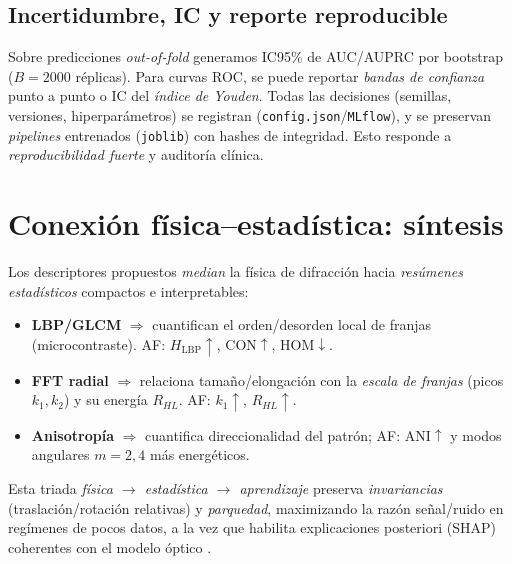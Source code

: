 \subsection{Incertidumbre, IC y reporte reproducible}
\label{subsec:uncertainty}

Sobre predicciones \emph{out-of-fold} generamos IC95\% de AUC/AUPRC por bootstrap ($B{=}2000$ réplicas). Para curvas ROC, se puede reportar \emph{bandas de confianza} punto a punto o IC del \emph{índice de Youden}. Todas las decisiones (semillas, versiones, hiperparámetros) se registran (\texttt{config.json}/\texttt{MLflow}), y se preservan \emph{pipelines} entrenados (\texttt{joblib}) con hashes de integridad. Esto responde a \emph{reproducibilidad fuerte} y auditoría clínica.

\section{Conexión física–estadística: síntesis}
\label{sec:conexion}

Los descriptores propuestos \emph{median} la física de difracción hacia \emph{resúmenes estadísticos} compactos e interpretables:
\begin{itemize}
\item \textbf{LBP/GLCM} $\Rightarrow$ cuantifican el orden/desorden local de franjas (microcontraste). AF: $H_\text{LBP}\!\uparrow$, $\mathrm{CON}\!\uparrow$, $\mathrm{HOM}\!\downarrow$.
\item \textbf{FFT radial} $\Rightarrow$ relaciona tamaño/elongación con la \emph{escala de franjas} (picos $k_1,k_2$) y su energía $R_{HL}$. AF: $k_1\!\uparrow$, $R_{HL}\!\uparrow$.
\item \textbf{Anisotropía} $\Rightarrow$ cuantifica direccionalidad del patrón; AF: $\mathrm{ANI}\!\uparrow$ y modos angulares $m{=}2,4$ más energéticos.
\end{itemize}
Esta triada \emph{física $\to$ estadística $\to$ aprendizaje} preserva \emph{invariancias} (traslación/rotación relativas) y \emph{parquedad}, maximizando la razón señal/ruido en regímenes de pocos datos, a la vez que habilita explicaciones poste\-riori (SHAP) coherentes con el modelo óptico \cite{Greenbaum2014STM,Chen2022Photonics,Tsamardinos2022Patterns}.

